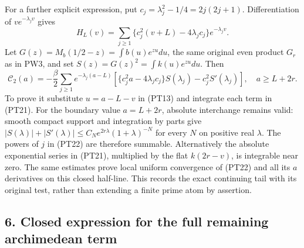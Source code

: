 \documentclass[
  10pt,
  a4paper,
]{article}
\begin{document}
For a further explicit expression, put \(c_j=\lambda_j^2-1/4=2j(2j+1)\).
Differentiation of \(v e^{-\lambda_jv}\) gives \[
H_L(v)=\sum_{j\ge1}\{c_j^2(v+L)-4\lambda_jc_j\}e^{-\lambda_jv}.
\tag{PT21}
\] Let \(G(z)=M_b(1/2-z)=\int b(u)e^{zu}du\), the same original even
product \(G_r\) as in PW3, and set \(S(z)=G(z)^2=\int k(u)e^{zu}du\).
Then \[
\boxed{\mathcal C_2(a)=-\frac\beta2
\sum_{j\ge1}e^{-\lambda_j(a-L)}
\left[\{c_j^2a-4\lambda_jc_j\}S(\lambda_j)-c_j^2S'(\lambda_j)\right],
\quad a\ge L+2r.}
\tag{PT22}
\] To prove it substitute \(u=a-L-v\) in (PT13) and integrate each term
in (PT21). For the boundary value \(a=L+2r\), absolute interchange
remains valid: smooth compact support and integration by parts give
\(|S(\lambda)|+|S'(\lambda)|\le C_Ne^{2r\lambda}(1+\lambda)^{-N}\) for
every \(N\) on positive real \(\lambda\). The powers of \(j\) in (PT22)
are therefore summable. Alternatively the absolute exponential series in
(PT21), multiplied by the flat \(k(2r-v)\), is integrable near zero. The
same estimates prove local uniform convergence of (PT22) and all its
\(a\) derivatives on this closed half-line. This records the exact
continuing tail with its original test, rather than extending a finite
prime atom by assertion.

\subsection{6. Closed expression for the full remaining archimedean
term}\label{closed-expression-for-the-full-remaining-archimedean-term}
\end{document}

